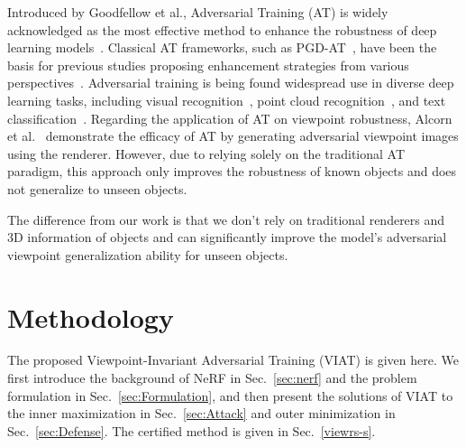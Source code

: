 \documentclass[10pt,journal,compsoc]{IEEEtran}
\begin{document}

Introduced by Goodfellow et al.\cite{goodfellow2014explaining}, Adversarial Training (AT) is widely acknowledged as the most effective method to enhance the robustness of deep learning models~\cite{athalye2018robustness,bai2021recent}. Classical AT frameworks, such as PGD-AT~\cite{madry2017towards}, have been the basis for previous studies proposing enhancement strategies from various perspectives~\cite{tramer2017ensemble,zhang2019theoretically,pang2020bag}. Adversarial training is being found widespread use in diverse deep learning tasks, including visual recognition~\cite{goodfellow2014explaining, madry2017towards,zhang2019theoretically}, point cloud recognition~\cite{liu2019extending,wang2022art}, and text classification~\cite{miyato2016adversarial}. Regarding the application of AT on viewpoint robustness, Alcorn et al.~\cite{alcorn2019strike} demonstrate the efficacy of AT by generating adversarial viewpoint images using the renderer. However, due to relying solely on the traditional AT paradigm, this approach only improves the robustness of known objects and does not generalize to unseen objects.

The difference from our work is that we don't rely on traditional renderers and 3D information of objects and can significantly improve the model's adversarial viewpoint generalization ability for unseen objects.

\section{Methodology}
\label{sec:3}
The proposed Viewpoint-Invariant Adversarial Training (VIAT) is given here. We first introduce the background of NeRF in Sec.~\ref{sec:nerf} and the problem formulation in Sec.~\ref{sec:Formulation}, and then present the solutions of VIAT to the inner maximization in Sec.~\ref{sec:Attack} and outer minimization in Sec.~\ref{sec:Defense}. The certified method is given in Sec.~\ref{viewrs-s}. 
\end{document}
